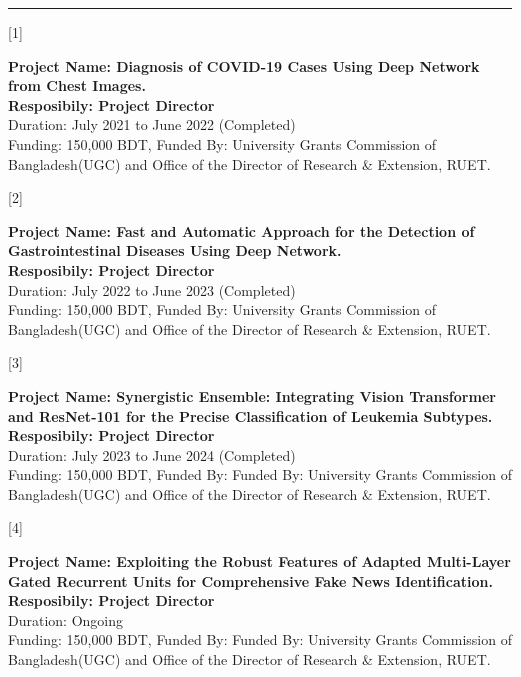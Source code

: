 \documentclass[a4paper,10pt]{article}
\newlength{\cvcolumngapwidth}
\newlength{\cvleftcolumnwidth}
\newlength{\cvrightcolumnwidth}
\newcommand{\cvsectionstyle}[1]{{\normalsize\cvsectionfont\textcolor{cvsectioncolor}{#1}}}
\newcommand{\cvheadingstyle}[1]{{\normalsize\cvheadingfont\textcolor{cvheadingcolor}{#1}}}
\newlength{\cvafteritemskipamount}
\newlength{\cvaftersectionskipamount}
\newlength{\cvparskip}
\newcommand{\cvsection}[1]{
    \begin{minipage}[t]{\cvleftcolumnwidth}
        \raggedleft\cvsectionstyle{#1}
    \end{minipage}%
    \hspace{\cvcolumngapwidth}%
    \begin{minipage}[t]{\cvrightcolumnwidth}
        \textcolor{cvrulecolor}{\rule{\cvrightcolumnwidth}{0.3mm}}
    \end{minipage}

    \vspace{\cvaftersectionskipamount}
}
\newcommand{\cvitem}[2]{
    \begin{minipage}[t]{\cvleftcolumnwidth}
        \raggedleft #1
    \end{minipage}%
    \hspace{\cvcolumngapwidth}%
    \begin{minipage}[t]{\cvrightcolumnwidth}
        \setlength{\parskip}{\cvparskip} #2
    \end{minipage}

    \vspace{\cvafteritemskipamount}
}
\begin{document}
\cvsection{FUNDED PROJECTS}
\cvitem{
    \cvheadingstyle{[1]}
}{
    \textbf{Project Name: Diagnosis of COVID-19 Cases Using Deep Network from Chest Images.}\\
    \textbf{Resposibily: Project Director}\\
    Duration: July 2021 to June 2022 (Completed)\\
    Funding: 150,000 BDT, Funded By: University Grants Commission of Bangladesh(UGC) and Office of the Director of Research \& Extension, RUET.
}
\cvitem{
    \cvheadingstyle{[2]}
}{
    \textbf{Project Name: Fast and Automatic Approach
for the Detection of Gastrointestinal Diseases
Using Deep Network.}\\
    \textbf{Resposibily: Project Director}\\
    Duration: July 2022 to June 2023 (Completed)\\
    Funding: 150,000 BDT, Funded By:  University Grants Commission of Bangladesh(UGC) and Office of the Director of Research \& Extension, RUET.
}
\cvitem{
    \cvheadingstyle{[3]}
}{
    \textbf{Project Name: Synergistic Ensemble:
Integrating Vision Transformer and ResNet-101
for the Precise Classification of Leukemia
Subtypes.}\\
    \textbf{Resposibily: Project Director}\\
    Duration: July 2023 to June 2024 (Completed)\\
    Funding: 150,000 BDT, Funded By: Funded By:  University Grants Commission of Bangladesh(UGC) and Office of the Director of Research \& Extension, RUET.
}
\cvitem{
    \cvheadingstyle{[4]}
}{
    \textbf{Project Name: Exploiting the Robust Features of Adapted Multi-Layer Gated Recurrent Units for
Comprehensive Fake News Identification.}\\
    \textbf{Resposibily: Project Director}\\
    Duration: Ongoing\\
    Funding: 150,000 BDT, Funded By: Funded By:  University Grants Commission of Bangladesh(UGC) and Office of the Director of Research \& Extension, RUET.}
\end{document}
